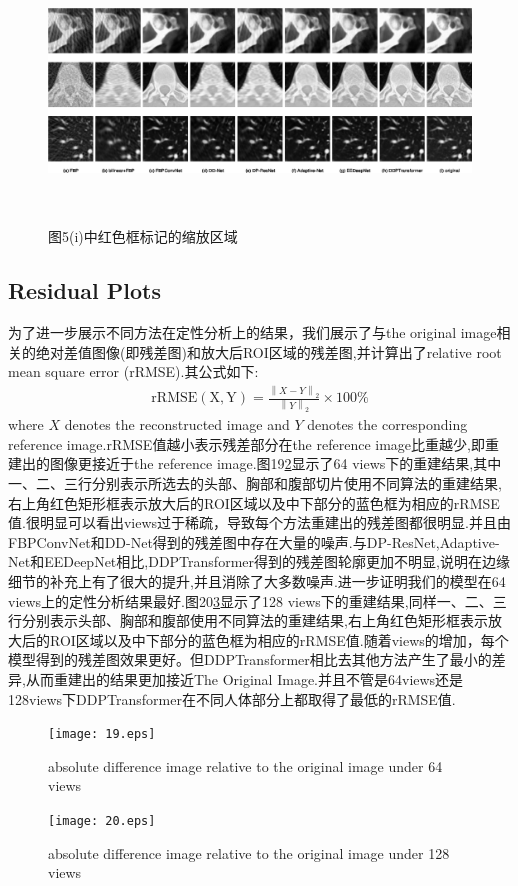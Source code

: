 \begin{figure}
	\centering
	\includegraphics[height=7cm,width=18cm]{15.eps}
	\caption{图5(i)中红色框标记的缩放区域}
	\label{fig8}
\end{figure}

\subsection{Residual Plots}
为了进一步展示不同方法在定性分析上的结果，我们展示了与the original image相关的绝对差值图像(即残差图)和放大后ROI区域的残差图,并计算出了relative root mean square error (rRMSE).其公式如下:
\begin{equation}
\begin{aligned}
\mathrm{rRMSE(X,Y)} = \frac{\left\|X-Y\right\|_2}{\left\|Y\right\|_2} \times 100\%   
\end{aligned}
\end{equation}
where $X$ denotes the reconstructed image and $Y$ denotes the
corresponding reference image.rRMSE值越小表示残差部分在the reference image比重越少,即重建出的图像更接近于the reference image.图19\ref{fig19}显示了64 views下的重建结果,其中一、二、三行分别表示所选去的头部、胸部和腹部切片使用不同算法的重建结果,右上角红色矩形框表示放大后的ROI区域以及中下部分的蓝色框为相应的rRMSE值.很明显可以看出views过于稀疏，导致每个方法重建出的残差图都很明显.并且由FBPConvNet和DD-Net得到的残差图中存在大量的噪声.与DP-ResNet,Adaptive-Net和EEDeepNet相比,DDPTransformer得到的残差图轮廓更加不明显,说明在边缘细节的补充上有了很大的提升,并且消除了大多数噪声.进一步证明我们的模型在64 views上的定性分析结果最好.图20\ref{fig20}显示了128 views下的重建结果,同样一、二、三行分别表示头部、胸部和腹部使用不同算法的重建结果,右上角红色矩形框表示放大后的ROI区域以及中下部分的蓝色框为相应的rRMSE值.随着views的增加，每个模型得到的残差图效果更好。但DDPTransformer相比去其他方法产生了最小的差异,从而重建出的结果更加接近The Original Image.并且不管是64views还是128views下DDPTransformer在不同人体部分上都取得了最低的rRMSE值.
\begin{figure}
	\centering
	\texttt{[image: 19.eps]}
	\caption{absolute difference image relative to the original image under 64 views}
	\label{fig19}
\end{figure}
\begin{figure}
	\centering
	\texttt{[image: 20.eps]}
	\caption{absolute difference image relative to the original image under 128 views}
	\label{fig20}
\end{figure}

